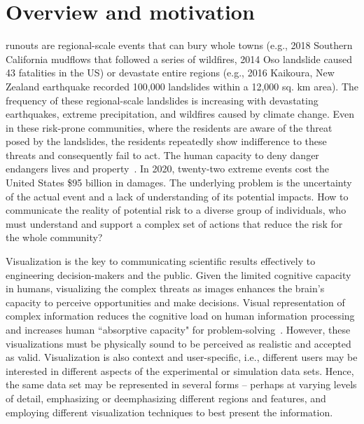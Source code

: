 \documentclass[journal]{IEEEtran}
\begin{document}
\IEEEpeerreviewmaketitle

\section{Overview and motivation}
 runouts are regional-scale events that can bury whole towns (e.g., 2018 Southern California mudflows that followed a series of wildfires, 2014 Oso landslide caused 43 fatalities in the US) or devastate entire regions (e.g., 2016 Kaikoura, New Zealand earthquake recorded 100,000 landslides within a 12,000 sq. km area). The frequency of these regional-scale landslides is increasing with devastating earthquakes, extreme precipitation, and wildfires caused by climate change. Even in these risk-prone communities, where the residents are aware of the threat posed by the landslides, the residents repeatedly show indifference to these threats and consequently fail to act. The human capacity to deny danger endangers lives and property~\cite{kim2020public}. In 2020, twenty-two extreme events cost the United States \$95 billion in damages. The underlying problem is the uncertainty of the actual event and a lack of understanding of its potential impacts. How to communicate the reality of potential risk to a diverse group of individuals, who must understand and support a complex set of actions that reduce the risk for the whole community?
  
Visualization is the key to communicating scientific results effectively to engineering decision-makers and the public. Given the limited cognitive capacity in humans, visualizing the complex threats as images enhances the brain's capacity to perceive opportunities and make decisions. Visual representation of complex information reduces the cognitive load on human information processing and increases human ``absorptive capacity" for problem-solving~\cite{kahneman2012human}. However, these visualizations must be physically sound to be perceived as realistic and accepted as valid. Visualization is also context and user-specific, i.e., different users may be interested in different aspects of the experimental or simulation data sets. Hence, the same data set may be represented in several forms – perhaps at varying levels of detail, emphasizing or deemphasizing different regions and features, and employing different visualization techniques to best present the information.
\end{document}

